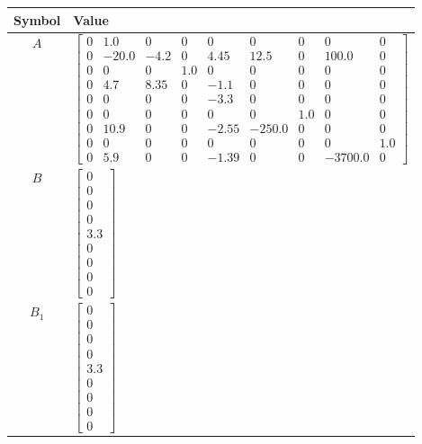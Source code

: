 \begin{tabular}{cl}
\hline
  Symbol  & Value                                                                                                                                                                                                                                                                                                                                                                                                                          \\
\hline
   $A$    & $\left[\begin{matrix}0 & 1.0 & 0 & 0 & 0 & 0 & 0 & 0 & 0\\0 & -20.0 & -4.2 & 0 & 4.45 & 12.5 & 0 & 100.0 & 0\\0 & 0 & 0 & 1.0 & 0 & 0 & 0 & 0 & 0\\0 & 4.7 & 8.35 & 0 & -1.1 & 0 & 0 & 0 & 0\\0 & 0 & 0 & 0 & -3.3 & 0 & 0 & 0 & 0\\0 & 0 & 0 & 0 & 0 & 0 & 1.0 & 0 & 0\\0 & 10.9 & 0 & 0 & -2.55 & -250.0 & 0 & 0 & 0\\0 & 0 & 0 & 0 & 0 & 0 & 0 & 0 & 1.0\\0 & 5.9 & 0 & 0 & -1.39 & 0 & 0 & -3700.0 & 0\end{matrix}\right]$ \\
   $B$    & $\left[\begin{matrix}0\\0\\0\\0\\3.3\\0\\0\\0\\0\end{matrix}\right]$                                                                                                                                                                                                                                                                                                                                                           \\
 $B_{1}$  & $\left[\begin{matrix}0\\0\\0\\0\\3.3\\0\\0\\0\\0\end{matrix}\right]$                                                                                                                                                                                                                                                                                                                                                           \\

\end{tabular}
